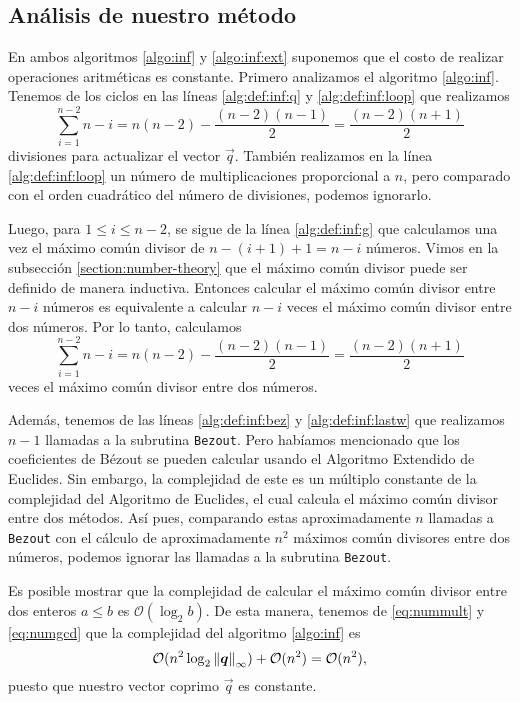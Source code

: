 \subsection{Análisis de nuestro método}
\label{subsec:inf:complex}
\noindent
En ambos algoritmos \ref{algo:inf} y \ref{algo:inf:ext} suponemos que el costo de realizar
operaciones aritméticas es constante. Primero analizamos el algoritmo \ref{algo:inf}. Tenemos de los
ciclos en las líneas \ref{alg:def:inf:q} y \ref{alg:def:inf:loop} que realizamos
\begin{equation}
	\label{eq:nummult}
	\sum_{i=1}^{n-2}n - i = n(n - 2) - \frac{(n-2)(n-1)}{2} = \frac{(n-2)(n+1)}{2}
\end{equation}
divisiones para actualizar el vector $\vec{q}$. También realizamos en la línea
\ref{alg:def:inf:loop} un número de multiplicaciones proporcional a $n$, pero comparado con el orden
cuadrático del número de divisiones, podemos ignorarlo.

Luego, para $1 \leq i \leq n - 2$, se sigue de la línea \ref{alg:def:inf:g} que calculamos una vez
el máximo común divisor de $n - (i + 1) + 1 = n - i$ números. Vimos en la subsección
\ref{section:number-theory} que el máximo común divisor puede ser definido de manera inductiva.
Entonces calcular el máximo común divisor entre $n - i$ números es equivalente a calcular $n - i$
veces el máximo común divisor entre dos números. Por lo tanto, calculamos
\begin{equation}
	\label{eq:numgcd}
	\sum_{i=1}^{n-2}n - i = n(n - 2) - \frac{(n-2)(n-1)}{2} = \frac{(n-2)(n+1)}{2}
\end{equation}
veces el máximo común divisor entre dos números.

Además, tenemos de las líneas \ref{alg:def:inf:bez} y \ref{alg:def:inf:lastw} que realizamos $n - 1$
llamadas a la subrutina \texttt{Bezout}. Pero habíamos mencionado que los coeficientes de Bézout se
pueden calcular usando el Algoritmo Extendido de Euclides. Sin embargo, la complejidad de este es un
múltiplo constante de la complejidad del Algoritmo de Euclides, el cual calcula el máximo común
divisor entre dos métodos. Así pues, comparando estas aproximadamente $n$ llamadas a \texttt{Bezout}
con el cálculo de aproximadamente $n^2$ máximos común divisores entre dos números, podemos ignorar las
llamadas a la subrutina \texttt{Bezout}.

Es posible mostrar que la complejidad de calcular el máximo común divisor entre dos enteros $a \leq
b$ es $\mathcal{O}(\log_2 b)$. De esta manera, tenemos de \eqref{eq:nummult} y \eqref{eq:numgcd} que
la complejidad del algoritmo \ref{algo:inf} es
\begin{equation*}
	\mathcal{O}(n^2\log_2\left\lVert \boldsymbol{q} \right\rVert_\infty) + \mathcal{O}(n^2) =
	\mathcal{O}(n^2),
\end{equation*}
puesto que nuestro vector coprimo $\vec{q}$ es constante.

